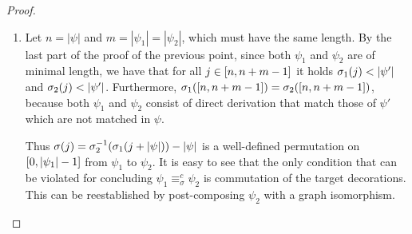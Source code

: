 \begin{proof}
\begin{enumerate}
  
\item 
%
%
%
%
%
  Let $n = |\psi|$ and $m = |\psi_1| = |\psi_2|$, which must have the same length.
  By the last part of the proof of the previous point,
  since 
  both $\psi_1$ and $\psi_2$ are of 
  minimal length, we have that for all $j \in
  \interval[n]{n+m-1}$ it holds  $\perm_1(j) < |\psi'|$ and $\perm_2(j) < |\psi'|$.
%
Furthermore, $\perm_1(\interval[n]{n+m-1}) = \perm_2(\interval[n]{n+m-1})$, 
because both $\psi_1$ and  $\psi_2$ consist of direct derivation that match 
those of $\psi'$ which are not matched in $\psi$.

Thus 
$\perm(j) = \perm_2^{-1}(\perm_1(j + |\psi|))-|\psi|$ is a
well-defined permutation on $\interval[0]{|\psi_1|-1}$ from $\psi_1$
to $\psi_2$. It is easy to see that the only condition that can be
violated for concluding $\psi_1 \equiv^c_\sigma \psi_2$ is commutation
of the target decorations. This can be reestablished by post-composing
$\psi_2$ with a graph isomorphism.
\end{enumerate}
\end{proof}

